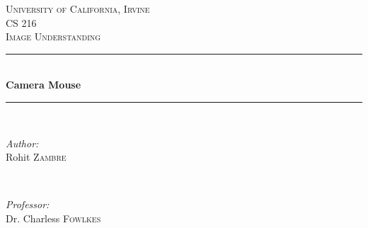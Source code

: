 \documentclass[12pt]{article}
\newcommand{\HRule}{\rule{\linewidth}{0.5mm}} %
\begin{document}
\begin{titlepage}

\center %


\textsc{\LARGE University of California, Irvine}\\[1.5cm] %
\textsc{\Large CS 216}\\[0.5cm] %
\textsc{\large Image Understanding}\\[0.5cm] %


\HRule \\[0.4cm]
{ \huge \bfseries Camera Mouse}\\[0.4cm] %
\HRule \\[1.5cm]


\begin{minipage}{0.4\textwidth}
	\begin{flushleft} \large
		\emph{Author:}\\
		Rohit \textsc{Zambre} %
	\end{flushleft}
\end{minipage}
~
\begin{minipage}{0.4\textwidth}
	\begin{flushright} \large
		\emph{Professor:} \\
		Dr. Charless \textsc{Fowlkes} %
	\end{flushright}
\end{minipage}\\[2cm]



\end{titlepage}
\end{document}
